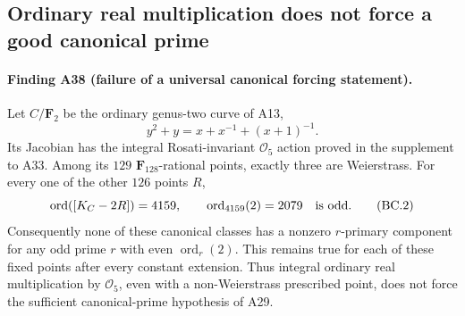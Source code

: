 \documentclass[11pt,a4paper]{article}
\begin{document}
\subsection{Ordinary real multiplication does not force a good canonical prime}

\paragraph{Finding A38 (failure of a universal canonical forcing statement).}
Let $C/\mathbf F_2$ be the ordinary genus-two curve of A13,
\[
                   y^2+y=x+x^{-1}+(x+1)^{-1}.
 \tag{BC.1}
\]
Its Jacobian has the integral Rosati-invariant $\mathcal O_5$
action proved in the supplement to A33. Among its $129$
$\mathbf F_{128}$-rational points, exactly three are Weierstrass.
For every one of the other $126$ points $R$,
\[
                  \operatorname{ord}([K_C-2R])=4159,
             \qquad \operatorname{ord}_{4159}(2)=2079
                       \quad\hbox{is odd}.
 \tag{BC.2}
\]
Consequently none of these canonical classes has a nonzero
$r$-primary component for any odd prime $r$ with even
$\operatorname{ord}_r(2)$. This remains true for each of these
fixed points after every constant extension. Thus integral
ordinary real multiplication by $\mathcal O_5$, even with a
non-Weierstrass prescribed point, does not force the sufficient
canonical-prime hypothesis of A29.
\end{document}
